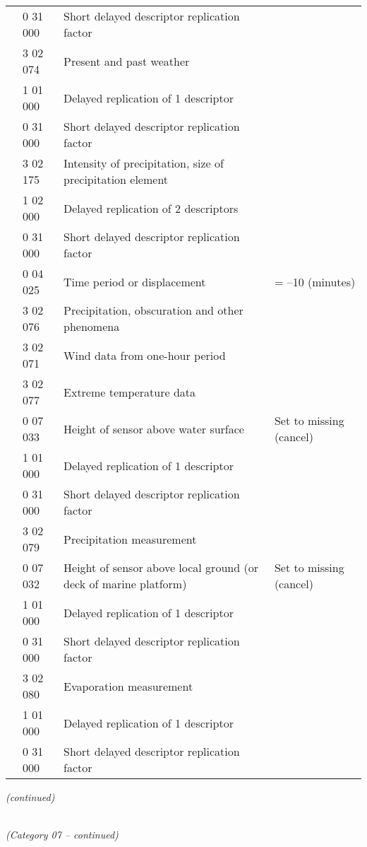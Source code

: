 \begin{longtable}[]{@{}llll@{}}
& 0 31 000 & Short delayed descriptor replication factor &\tabularnewline
& 3 02 074 & Present and past weather &\tabularnewline
& 1 01 000 & Delayed replication of 1 descriptor &\tabularnewline
& 0 31 000 & Short delayed descriptor replication factor &\tabularnewline
& 3 02 175 & Intensity of precipitation, size of precipitation element &\tabularnewline
& 1 02 000 & Delayed replication of 2 descriptors &\tabularnewline
& 0 31 000 & Short delayed descriptor replication factor &\tabularnewline
& 0 04 025 & Time period or displacement & = --10 (minutes)\tabularnewline
& 3 02 076 & Precipitation, obscuration and other phenomena &\tabularnewline
& 3 02 071 & Wind data from one-hour period &\tabularnewline
& 3 02 077 & Extreme temperature data &\tabularnewline
& 0 07 033 & Height of sensor above water surface & Set to missing (cancel)\tabularnewline
& 1 01 000 & Delayed replication of 1 descriptor &\tabularnewline
& 0 31 000 & Short delayed descriptor replication factor &\tabularnewline
& 3 02 079 & Precipitation measurement &\tabularnewline
& 0 07 032 & Height of sensor above local ground (or deck of marine platform) & Set to missing (cancel)\tabularnewline
& 1 01 000 & Delayed replication of 1 descriptor &\tabularnewline
& 0 31 000 & Short delayed descriptor replication factor &\tabularnewline
& 3 02 080 & Evaporation measurement &\tabularnewline
& 1 01 000 & Delayed replication of 1 descriptor &\tabularnewline
& 0 31 000 & Short delayed descriptor replication factor &\tabularnewline
\bottomrule
\end{longtable}

\emph{(continued)}

\emph{\\
(Category 07 -- continued)}

